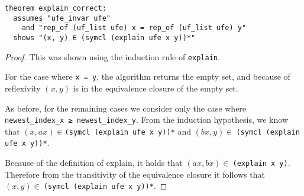 \begin{lstlisting}
theorem explain_correct:
  assumes "ufe_invar ufe"
    and "rep_of (uf_list ufe) x = rep_of (uf_list ufe) y"
  shows "(x, y) ∈ (symcl (explain ufe x y))*"
\end{lstlisting}

\begin{proof}
This was shown using the induction rule of \lstinline|explain|.

For the case where \lstinline|x = y|, the algorithm returns the empty set, and because of reflexivity $(x, y)$ is in the equivalence closure of the empty set.

As before, for the remaining cases we consider only the case where \lstinline|newest_index_x ≥ newest_index_y|.
From the induction hypothesis, we know that $(x, ax) \in$\lstinline{(symcl (explain ufe x y))*} and $(bx, y) \in\:$\lstinline{(symcl (explain ufe x y))*}.

Because of the definition of explain, it holds that $(ax, bx) \in\:$\lstinline{(explain x y)}. Therefore from the transitivity of the equivalence closure it follows that $(x, y) \in\:$\lstinline{(symcl (explain ufe x y))*}.
\end{proof}
